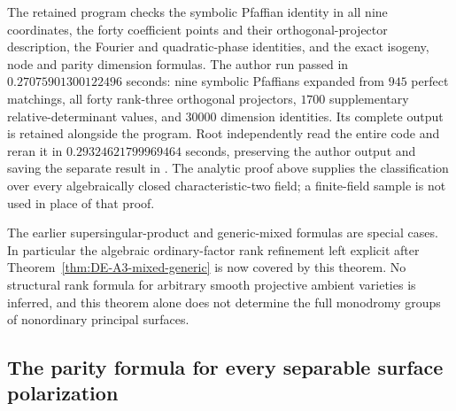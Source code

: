 \begin{remark}
\label{rem:DE-A3-ppav-rank-checks}
The retained program
checks the symbolic Pfaffian identity in all nine coordinates, the
forty coefficient points and their orthogonal-projector description,
the Fourier and quadratic-phase identities, and the exact isogeny,
node and parity dimension formulas.  The author run passed in
$0.27075901300122496$ seconds: nine symbolic Pfaffians expanded from
$945$ perfect matchings, all forty rank-three orthogonal projectors,
$1700$ supplementary relative-determinant values, and $30000$ dimension
identities.  Its complete output is retained alongside the program.
Root independently read the entire code and reran it in
$0.29324621799969464$ seconds, preserving the author output and saving
the separate result in .
The analytic proof above supplies the classification
over every algebraically closed characteristic-two field; a finite-field
sample is not used in place of that proof.

The earlier supersingular-product and generic-mixed formulas are
special cases.  In particular the algebraic ordinary-factor rank
refinement left explicit after Theorem~\ref{thm:DE-A3-mixed-generic}
is now covered by this theorem.
No structural rank formula for arbitrary smooth projective ambient
varieties is inferred, and this theorem alone does not determine the
full monodromy groups of nonordinary principal surfaces.
\end{remark}


\subsection{The parity formula for every separable surface polarization}
\label{sec:DE-A3-separable-polarizations}

